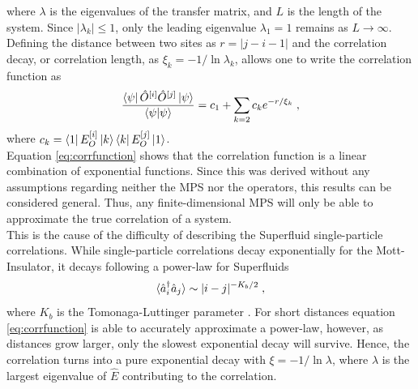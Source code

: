 where $\lambda$ is the eigenvalues of the transfer matrix, and $L$ is the length of the system. Since $|\lambda_k| \leq 1 $, only the leading eigenvalue $\lambda_1 = 1$ remains as $L \to \infty$. Defining the distance between two sites as $r = |j - i -1|$ and the correlation decay, or correlation length, as $\xi_k = -1/\ln \lambda_k$, allows one to write the correlation function as
\begin{equation}
	\frac{\bra{\psi} \hat{O}^{[i]} \hat{O}^{[j]} \ket{\psi}}{\braket{\psi | \psi}} = c_1 + \sum_{k = 2} c_k e^{-r/ \xi_k} \; , \label{eq:corrfunction}
\end{equation}
where $c_k = \bra{1} E_{O}^{[i]} \ket{k} \bra{k} E_{O}^{[j]} \ket{1}$. \cite{schollwock} \\
Equation \ref{eq:corrfunction} shows that the correlation function is a linear combination of exponential functions. Since this was derived without any assumptions regarding neither the MPS nor the operators, this results can be considered general. Thus, any finite-dimensional MPS will only be able to approximate the true correlation of a system.\\
This is the cause of the difficulty of describing the Superfluid single-particle correlations. While single-particle correlations decay exponentially for the Mott-Insulator, it decays following a power-law for Superfluids
\begin{equation}
	\braket{\hat{a}_{i}^{\dag} \hat{a}_{j}} \sim |i - j|^{-K_b /2} \; ,
\end{equation}
where $K_b$ is the Tomonaga-Luttinger parameter \cite{characPhases}. For short distances equation \ref{eq:corrfunction} is able to accurately approximate a power-law, however, as distances grow larger, only the slowest exponential decay will survive. Hence, the correlation turns into a pure exponential decay with $\xi = -1/ \ln \lambda$, where $\lambda$ is the largest eigenvalue of $\hat{E}$ contributing to the correlation.


